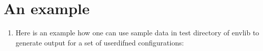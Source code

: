 \documentclass[a4paper,11pt,english]{sphinxmanual}
\begin{document}
\begin{sphinxVerbatim}[commandchars=\\\{\}]
\end{sphinxVerbatim}


\chapter{An example}
\label{\detokenize{index:an-example}}\begin{enumerate}
%
\setcounter{enumi}{-1}
\item {} 
Here is an example how one can use sample data in test directory of envlib to generate output for a set of user\sphinxhyphen{}difned configurations:

\end{enumerate}
\end{document}
